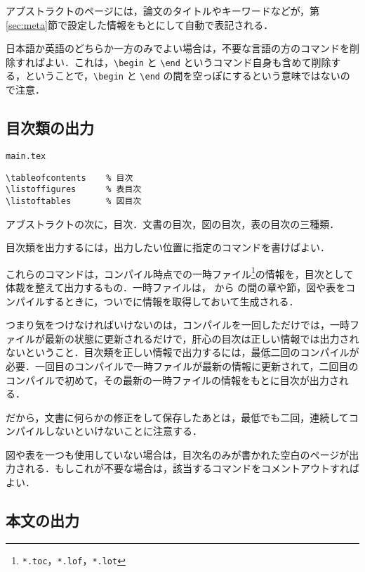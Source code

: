 アブストラクトのページには，論文のタイトルやキーワードなどが，第\ref{sec:meta}節で設定した情報をもとにして自動で表記される．

日本語か英語のどちらか一方のみでよい場合は，不要な言語の方のコマンドを削除すればよい．これは，\verb|\begin| と \verb|\end| というコマンド自身も含めて削除する，ということで，\verb|\begin| と \verb|\end| の間を空っぽにするという意味ではないので注意．



\subsection{目次類の出力}
\label{sec:toc}

\begin{itembox}[l]{\texttt{main.tex}}
\begin{verbatim}
\tableofcontents	% 目次
\listoffigures		% 表目次
\listoftables		% 図目次
\end{verbatim}
\end{itembox}

アブストラクトの次に，目次．文書の目次，図の目次，表の目次の三種類．

目次類を出力するには，出力したい位置に指定のコマンドを書けばよい．

これらのコマンドは，コンパイル時点での一時ファイル\footnote{\texttt{*.toc}，\texttt{*.lof}，\texttt{*.lot}}の情報を，目次として体裁を整えて出力するもの．一時ファイルは，\verb|| から \verb|| の間の章や節，図や表をコンパイルするときに，ついでに情報を取得しておいて生成される．

つまり気をつけなければいけないのは，コンパイルを一回しただけでは，一時ファイルが最新の状態に更新されるだけで，肝心の目次は正しい情報では出力されないということ．目次類を正しい情報で出力するには，最低二回のコンパイルが必要．一回目のコンパイルで一時ファイルが最新の情報に更新されて，二回目のコンパイルで初めて，その最新の一時ファイルの情報をもとに目次が出力される．

だから，文書に何らかの修正をして保存したあとは，最低でも二回，連続してコンパイルしないといけないことに注意する．

図や表を一つも使用していない場合は，目次名のみが書かれた空白のページが出力される．もしこれが不要な場合は，該当するコマンドをコメントアウトすればよい．


\subsection{本文の出力}

